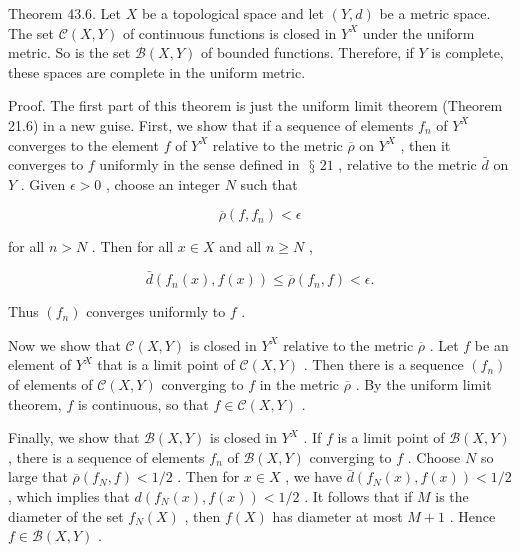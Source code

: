\documentclass[10pt]{article}
\begin{document}
Theorem 43.6. Let \(X\) be a topological space and let \(\left( {Y,d}\right)\) be a metric space. The set \(\mathcal{C}\left( {X,Y}\right)\) of continuous functions is closed in \({Y}^{X}\) under the uniform metric. So is the set \(\mathcal{B}\left( {X,Y}\right)\) of bounded functions. Therefore, if \(Y\) is complete, these spaces are complete in the uniform metric.

Proof. The first part of this theorem is just the uniform limit theorem (Theorem 21.6) in a new guise. First, we show that if a sequence of elements \({f}_{n}\) of \({Y}^{X}\) converges to the element \(f\) of \({Y}^{X}\) relative to the metric \(\overline{\rho }\) on \({Y}^{X}\) , then it converges to \(f\) uniformly in the sense defined in \(\text{ § }{21}\) , relative to the metric \(\bar{d}\) on \(Y\) . Given \(\epsilon  > 0\) , choose an integer \(N\) such that

\[
\overline{\rho }\left( {f,{f}_{n}}\right)  < \epsilon
\]

for all \(n > N\) . Then for all \(x \in  X\) and all \(n \geq  N\) ,

\[
\bar{d}\left( {{f}_{n}\left( x\right) ,f\left( x\right) }\right)  \leq  \overline{\rho }\left( {{f}_{n},f}\right)  < \epsilon .
\]

Thus \(\left( {f}_{n}\right)\) converges uniformly to \(f\) .

Now we show that \(\mathcal{C}\left( {X,Y}\right)\) is closed in \({Y}^{X}\) relative to the metric \(\overline{\rho }\) . Let \(f\) be an element of \({Y}^{X}\) that is a limit point of \(\mathcal{C}\left( {X,Y}\right)\) . Then there is a sequence \(\left( {f}_{n}\right)\) of elements of \(\mathcal{C}\left( {X,Y}\right)\) converging to \(f\) in the metric \(\overline{\rho }\) . By the uniform limit theorem, \(f\) is continuous, so that \(f \in  \mathcal{C}\left( {X,Y}\right)\) .

Finally, we show that \(\mathcal{B}\left( {X,Y}\right)\) is closed in \({Y}^{X}\) . If \(f\) is a limit point of \(\mathcal{B}\left( {X,Y}\right)\) , there is a sequence of elements \({f}_{n}\) of \(\mathcal{B}\left( {X,Y}\right)\) converging to \(f\) . Choose \(N\) so large that \(\overline{\rho }\left( {{f}_{N},f}\right)  < 1/2\) . Then for \(x \in  X\) , we have \(\bar{d}\left( {{f}_{N}\left( x\right) ,f\left( x\right) }\right)  < 1/2\) , which implies that \(d\left( {{f}_{N}\left( x\right) ,f\left( x\right) }\right)  < 1/2\) . It follows that if \(M\) is the diameter of the set \({f}_{N}\left( X\right)\) , then \(f\left( X\right)\) has diameter at most \(M + 1\) . Hence \(f \in  \mathcal{B}\left( {X,Y}\right)\) .
\end{document}
